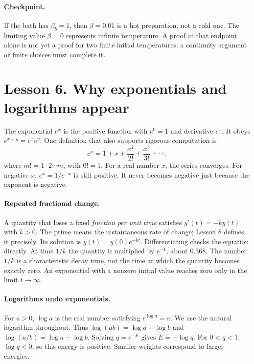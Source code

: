 \paragraph{Checkpoint.}
If the bath has $\beta_b=1$, then $\beta=0.01$ is a hot preparation, not a cold
one. The limiting value $\beta=0$ represents infinite temperature. A proof at
that endpoint alone is not yet a proof for two finite initial temperatures;
a continuity argument or finite choices must complete it.

\clearpage
\section*{Lesson 6. Why exponentials and logarithms appear}
The exponential $e^x$ is the positive function with $e^0=1$ and derivative
$e^x$. It obeys $e^{x+y}=e^xe^y$. One definition that also supports rigorous
computation is
\[
e^x=1+x+\frac{x^2}{2!}+\frac{x^3}{3!}+\cdots,
\]
where $m!=1\cdot2\cdots m$, with $0!=1$. For a real number $x$, the series
converges. For negative $x$, $e^x=1/e^{-x}$ is still positive. It never becomes
negative just because the exponent is negative.

\paragraph{Repeated fractional change.}
A quantity that loses a fixed \emph{fraction per unit time} satisfies
$y'(t)=-k y(t)$ with $k>0$. The prime means the instantaneous rate of change; Lesson 8 defines it
precisely. Its solution is $y(t)=y(0)e^{-kt}$. Differentiating
checks the equation directly. At time $1/k$ the quantity is multiplied by
$e^{-1}$, about $0.368$. The number $1/k$ is a characteristic decay time, not
the time at which the quantity becomes exactly zero. An exponential with a
nonzero initial value reaches zero only in the limit $t\to\infty$.

\paragraph{Logarithms undo exponentials.}
For $a>0$, $\log a$ is the real number satisfying $e^{\log a}=a$.
We use the natural logarithm throughout. Thus $\log(ab)=\log a+\log b$ and
$\log(a/b)=\log a-\log b$. Solving $q=e^{-E}$ gives $E=-\log q$.
For $0<q<1$, $\log q<0$, so this energy is positive. Smaller weights correspond
to larger energies.


